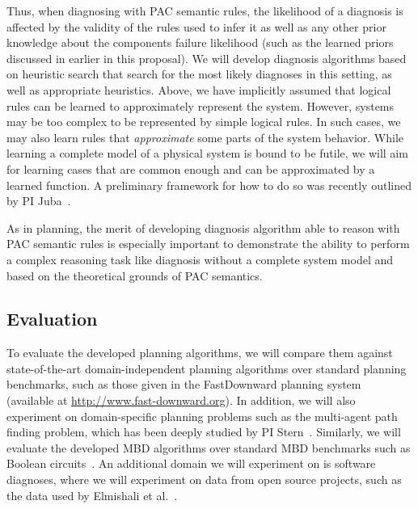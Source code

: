 \documentclass[12pt]{article}
\begin{document}
Thus, when diagnosing with PAC semantic rules,  the likelihood of a diagnosis is affected by  the validity of the rules used to infer it as well as any other prior knowledge about the components failure likelihood (such as the learned priors discussed in earlier in this proposal). We will develop diagnosis algorithms based on heuristic search that search for the most likely diagnoses in this setting, as well as appropriate heuristics.
Above, we have implicitly assumed that logical rules can be learned to approximately represent the system. However, systems may be too complex to be represented by simple logical rules. In such cases, we may also learn rules that {\em approximate} some parts of the system behavior. While learning a complete model of a physical system is bound to be futile, we will aim for learning cases that are common enough and can be approximated by a learned function. A preliminary framework for how to do so was recently outlined by PI Juba~\cite{juba2016aaai,juba2016conditional}.




As in planning, the merit of developing diagnosis algorithm able to reason with PAC semantic rules is especially important to demonstrate the ability to perform a complex reasoning task like diagnosis without a complete system model and based on the theoretical grounds of PAC semantics. 


\subsection{Evaluation}
\label{sec:evaluation}


To evaluate the developed planning algorithms, we will compare them against state-of-the-art domain-independent planning algorithms over standard planning benchmarks, such as those given in the FastDownward planning system~\cite{helmert2006fast} (available at \url{http://www.fast-downward.org}). In addition, we will also experiment on domain-specific planning problems such as the multi-agent path finding problem, which has been deeply studied by PI Stern~\cite{sharon2013increasing,sharon2015conflict,boyarski2015icbs,boyrasky2015dont}. Similarly, we will evaluate the developed MBD algorithms over standard MBD benchmarks such as Boolean circuits~\cite{hansen1999unveiling,brglez1999design}. An additional domain we will experiment on is software diagnoses, where we will experiment on data from open source projects, such as the data used by Elmishali et al.~\cite{elmishali2016dataAugmented}. 
\end{document}
